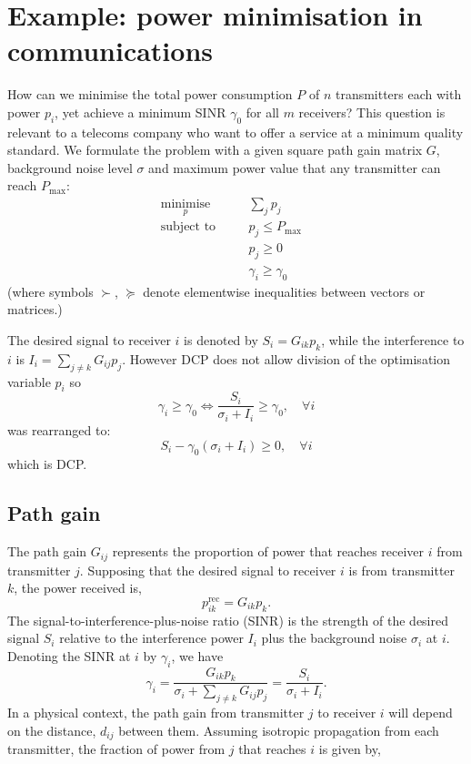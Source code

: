 \documentclass[twocolumn,secnumarabic,amssymb, nobibnotes, aps, prl,superscriptaddress]{revtex4-1}
\begin{document}
\section{Example: power minimisation in communications}
How can we minimise the total power consumption $P$ of $n$ transmitters each with power $p_i$, yet achieve a minimum SINR $\gamma_0$ for all $m$ receivers? This question is relevant to a telecoms company who want to offer a service at a minimum quality standard. We formulate the problem with a given square path gain matrix $G$, background noise level $\sigma$ and maximum power value that any transmitter can reach $P_{\text{max}}$:
		\begin{align*}
				&\underset{p}{\text{minimise}} \quad &&\sum_j p_j\\
				&\text{subject to} \quad &&p_j \leq P_{\max}\\
				& \quad &&p_j \geq 0\\
				& \quad &&\gamma_i \geq \gamma_0&&
		\end{align*}
(where symbols $\succ$, $\succeq$ denote elementwise inequalities between vectors or matrices.)

The desired signal to receiver $i$ is denoted by $S_i = G_{ik}p_k$, while the interference to $i$ is $I_i = \sum_{j\neq k}G_{ij}p_j$. However DCP does not allow division of the optimisation variable $p_i$ so  
\begin{equation*}
  \gamma_i \geq \gamma_0\Longleftrightarrow  \frac{S_i}{\sigma_i + I_i}\geq \gamma_0, \quad \forall i
\end{equation*}
was rearranged to:
\begin{equation*}
S_i-\gamma_0(\sigma_i + I_i)\geq 0, \quad \forall i
\end{equation*} which is DCP.
\subsection{Path gain}
The path gain $G_{ij}$ represents the proportion of power that reaches receiver $i$ from transmitter $j$. Supposing that the desired signal to receiver $i$ is from transmitter $k$, the power received is,
\begin{equation}
p_{ik}^{\text{rec}} = G_{ik}p_k.
\end{equation}
The signal-to-interference-plus-noise ratio (SINR) is the strength of the desired signal $S_i$ relative to the interference power $I_i$ plus the background noise $\sigma_i$ at $i$. Denoting the SINR at $i$ by $\gamma_i$, we have
\begin{equation}
\gamma_i = \frac{G_{ik}p_k}{\sigma_i+\sum_{j\neq k}G_{ij}p_j}
=\frac{S_i}{\sigma_i+I_i}.
\end{equation}
In a physical context, the path gain from transmitter $j$ to receiver $i$ will depend on the distance, $d_{ij}$ between them.  Assuming isotropic propagation from each transmitter, the fraction of power from $j$ that reaches $i$ is given by,
\end{document}
